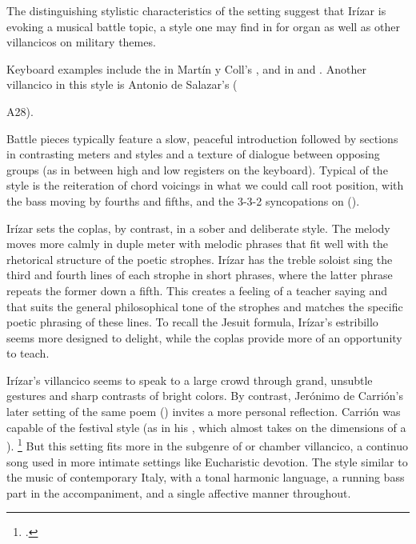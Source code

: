 The distinguishing stylistic characteristics of the setting suggest that Irízar is evoking a musical battle topic, a style one may find in  for organ as well as other villancicos on military themes.%
\begin{Footnote}
    Keyboard examples include the  in Martín y Coll's \citXXX, and in  and .
    Another villancico in this style is Antonio de Salazar's  (\signature{MEX-Mc}{A28}).
\end{Footnote}
Battle pieces typically feature a slow, peaceful introduction followed by sections in contrasting meters and styles and a texture of dialogue between opposing groups (as in between high and low registers on the keyboard). 
Typical of the style is the reiteration of chord voicings in what we could call root position, with the bass moving by fourths and fifths, and the 3-3-2 syncopations on  ().

Irízar sets the coplas, by contrast, in a sober and deliberate style.
The melody moves more calmly in duple meter with melodic phrases that fit well with the rhetorical structure of the poetic strophes.
Irízar has the treble soloist sing the third and fourth lines of each strophe in short phrases, where the latter phrase repeats the former down a fifth.
This creates a feeling of a teacher saying  and  that suits the general philosophical tone of the strophes and matches the specific poetic phrasing of these lines.
To recall the Jesuit formula, Irízar's estribillo seems more designed to delight, while the coplas provide more of an opportunity to teach.

Irízar's villancico seems to speak to a large crowd through grand, unsubtle gestures and sharp contrasts of bright colors.
By contrast, Jerónimo de Carrión's later setting of the same poem () invites a more personal reflection.%
    \Autocite[\XXX]{Cashner:SingingAboutSingingI}
Carrión was capable of the festival style (as in his , which almost takes on the dimensions of a ).%
\footnote{\signature{E-SE}{\XXX}.}
But this setting fits more in the subgenre of  or chamber villancico, a continuo song used in more intimate settings like Eucharistic devotion.%
The style similar to the  music of contemporary Italy, with a tonal harmonic language, a running bass part in the accompaniment, and a single affective manner throughout.


